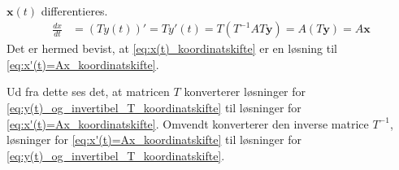 \begin{bev}\textbf{}\\
$\textbf{x}(t)$ differentieres.
    \begin{align*}
        \frac{dx}{dt}   &= \left(Ty(t)\right)' 
                         = Ty'(t)
                         = T\left(T^{-1}AT \textbf{y}\right)
                         = A(T\textbf{y})
                         = A\textbf{x}
    \end{align*}
Det er hermed bevist, at \eqref{eq:x(t)_koordinatskifte} er en løsning til \eqref{eq:x'(t)=Ax_koordinatskifte}.  
\end{bev}

Ud fra dette ses det, at matricen $T$ konverterer løsninger for  \eqref{eq:y(t)_og_invertibel_T_koordinatskifte} til løsninger for \eqref{eq:x'(t)=Ax_koordinatskifte}. Omvendt konverterer den inverse matrice $T^{-1}$, løsninger for \eqref{eq:x'(t)=Ax_koordinatskifte}  til løsninger for \eqref{eq:y(t)_og_invertibel_T_koordinatskifte}. 


